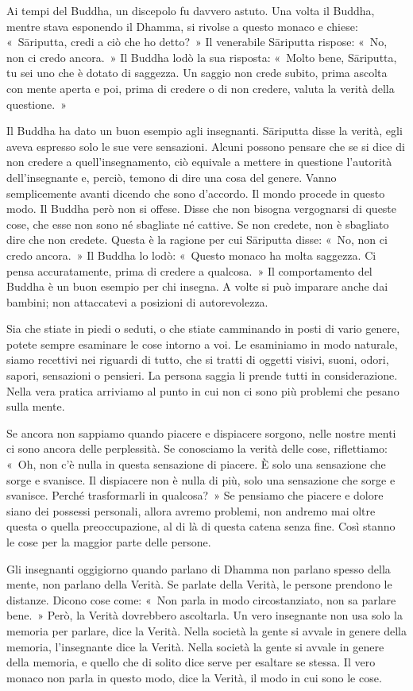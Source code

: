 Ai tempi del Buddha, un discepolo fu davvero astuto. Una volta il
Buddha, mentre stava esponendo il Dhamma, si rivolse a questo monaco e
chiese: «~Sāriputta, credi a ciò che ho detto?~» Il venerabile Sāriputta
rispose: «~No, non ci credo ancora.~» Il Buddha lodò la sua risposta:
«~Molto bene, Sāriputta, tu sei uno che è dotato di saggezza. Un saggio
non crede subito, prima ascolta con mente aperta e poi, prima di credere
o di non credere, valuta la verità della questione.~»

Il Buddha ha dato un buon esempio agli insegnanti. Sāriputta disse la
verità, egli aveva espresso solo le sue vere sensazioni. Alcuni possono
pensare che se si dice di non credere a quell'insegnamento, ciò equivale
a mettere in questione l'autorità dell'insegnante e, perciò, temono di
dire una cosa del genere. Vanno semplicemente avanti dicendo che sono
d'accordo. Il mondo procede in questo modo. Il Buddha però non si
offese. Disse che non bisogna vergognarsi di queste cose, che esse non
sono né sbagliate né cattive. Se non credete, non è sbagliato dire che
non credete. Questa è la ragione per cui Sāriputta disse: «~No, non ci
credo ancora.~» Il Buddha lo lodò: «~Questo monaco ha molta saggezza. Ci
pensa accuratamente, prima di credere a qualcosa.~» Il comportamento del
Buddha è un buon esempio per chi insegna. A volte si può imparare anche
dai bambini; non attaccatevi a posizioni di autorevolezza.

Sia che stiate in piedi o seduti, o che stiate camminando in posti di
vario genere, potete sempre esaminare le cose intorno a voi. Le
esaminiamo in modo naturale, siamo recettivi nei riguardi di tutto, che
si tratti di oggetti visivi, suoni, odori, sapori, sensazioni o
pensieri. La persona saggia li prende tutti in considerazione. Nella
vera pratica arriviamo al punto in cui non ci sono più problemi che
pesano sulla mente.

Se ancora non sappiamo quando piacere e dispiacere sorgono, nelle nostre
menti ci sono ancora delle perplessità. Se conosciamo la verità delle
cose, riflettiamo: «~Oh, non c'è nulla in questa sensazione di piacere.
È solo una sensazione che sorge e svanisce. Il dispiacere non è nulla di
più, solo una sensazione che sorge e svanisce. Perché trasformarli in
qualcosa?~» Se pensiamo che piacere e dolore siano dei possessi
personali, allora avremo problemi, non andremo mai oltre questa o quella
preoccupazione, al di là di questa catena senza fine. Così stanno le
cose per la maggior parte delle persone.

Gli insegnanti oggigiorno quando parlano di Dhamma non parlano spesso
della mente, non parlano della Verità. Se parlate della Verità, le
persone prendono le distanze. Dicono cose come: «~Non parla in modo
circostanziato, non sa parlare bene.~» Però, la Verità dovrebbero
ascoltarla. Un vero insegnante non usa solo la memoria per parlare, dice
la Verità. Nella società la gente si avvale in genere della memoria,
l'insegnante dice la Verità. Nella società la gente si avvale in genere
della memoria, e quello che di solito dice serve per esaltare se stessa.
Il vero monaco non parla in questo modo, dice la Verità, il modo in cui
sono le cose.

